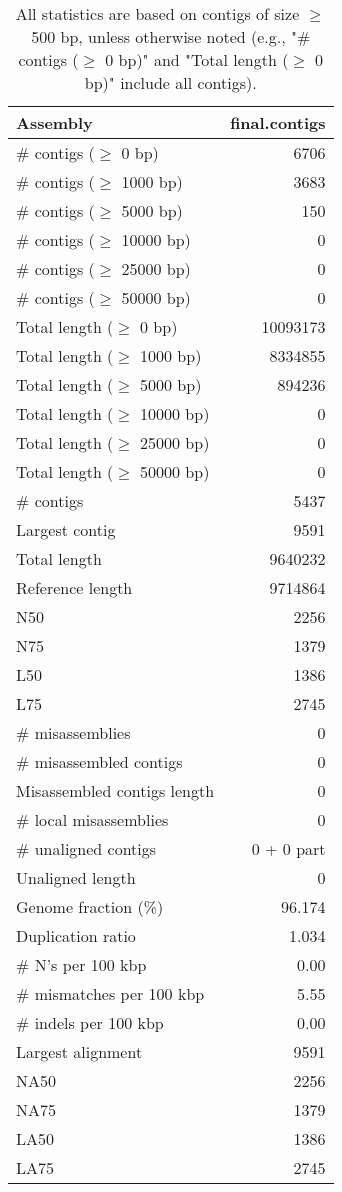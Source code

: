 \documentclass[12pt,a4paper]{article}
\begin{document}
\begin{table}[ht]
\begin{center}
\caption{All statistics are based on contigs of size $\geq$ 500 bp, unless otherwise noted (e.g., "\# contigs ($\geq$ 0 bp)" and "Total length ($\geq$ 0 bp)" include all contigs).}
\begin{tabular}{|l*{1}{|r}|}
\hline
Assembly & final.contigs \\ \hline
\# contigs ($\geq$ 0 bp) & 6706 \\ \hline
\# contigs ($\geq$ 1000 bp) & 3683 \\ \hline
\# contigs ($\geq$ 5000 bp) & 150 \\ \hline
\# contigs ($\geq$ 10000 bp) & 0 \\ \hline
\# contigs ($\geq$ 25000 bp) & 0 \\ \hline
\# contigs ($\geq$ 50000 bp) & 0 \\ \hline
Total length ($\geq$ 0 bp) & 10093173 \\ \hline
Total length ($\geq$ 1000 bp) & 8334855 \\ \hline
Total length ($\geq$ 5000 bp) & 894236 \\ \hline
Total length ($\geq$ 10000 bp) & 0 \\ \hline
Total length ($\geq$ 25000 bp) & 0 \\ \hline
Total length ($\geq$ 50000 bp) & 0 \\ \hline
\# contigs & 5437 \\ \hline
Largest contig & 9591 \\ \hline
Total length & 9640232 \\ \hline
Reference length & 9714864 \\ \hline
N50 & 2256 \\ \hline
N75 & 1379 \\ \hline
L50 & 1386 \\ \hline
L75 & 2745 \\ \hline
\# misassemblies & 0 \\ \hline
\# misassembled contigs & 0 \\ \hline
Misassembled contigs length & 0 \\ \hline
\# local misassemblies & 0 \\ \hline
\# unaligned contigs & 0 + 0 part \\ \hline
Unaligned length & 0 \\ \hline
Genome fraction (\%) & 96.174 \\ \hline
Duplication ratio & 1.034 \\ \hline
\# N's per 100 kbp & 0.00 \\ \hline
\# mismatches per 100 kbp & 5.55 \\ \hline
\# indels per 100 kbp & 0.00 \\ \hline
Largest alignment & 9591 \\ \hline
NA50 & 2256 \\ \hline
NA75 & 1379 \\ \hline
LA50 & 1386 \\ \hline
LA75 & 2745 \\ \hline
\end{tabular}
\end{center}
\end{table}
\end{document}
